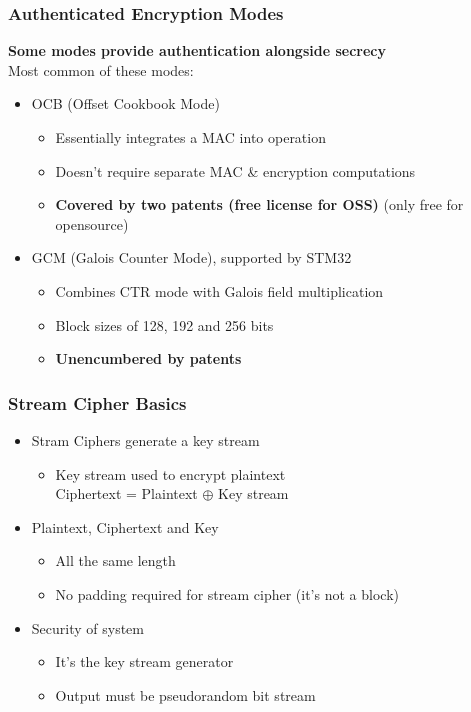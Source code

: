 \subsubsection{Authenticated Encryption Modes}
\textbf{Some modes provide authentication alongside secrecy}\\
Most common of these modes:
\begin{itemize}
  \item OCB (Offset Cookbook Mode)
        \begin{itemize}
          \item Essentially integrates a MAC into operation
          \item Doesn't require separate MAC \& encryption computations
          \item \textbf{Covered by two patents (free license for OSS)} (only free for opensource)
        \end{itemize}
  \item GCM (Galois Counter Mode), supported by STM32
        \begin{itemize}
          \item Combines CTR mode with Galois field multiplication
          \item Block sizes of 128, 192 and 256 bits
          \item \textbf{Unencumbered by patents}
        \end{itemize}
\end{itemize}

\subsubsection{Stream Cipher Basics}
\begin{itemize}
  \item Stram Ciphers generate a key stream
        \begin{itemize}
          \item Key stream used to encrypt plaintext\\
                Ciphertext = Plaintext $\oplus$ Key stream
        \end{itemize}
  \item Plaintext, Ciphertext and Key
        \begin{itemize}
          \item All the same length
          \item No padding required for stream cipher (it's not a block)
        \end{itemize}
  \item Security of system
        \begin{itemize}
          \item It's the key stream generator
          \item Output must be pseudorandom bit stream
        \end{itemize}
\end{itemize}

